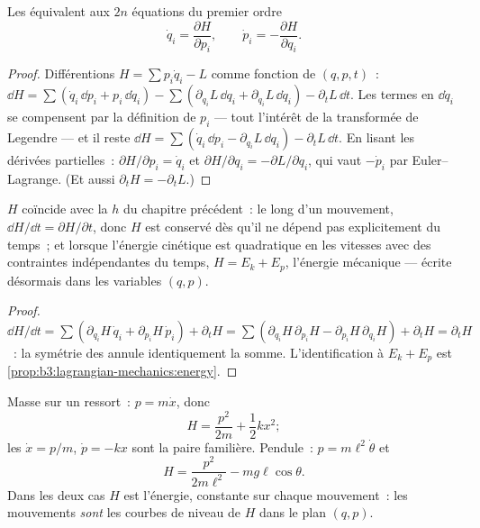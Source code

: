 \begin{theorem}\label{thm:b3:hamiltonian-mechanics:canonical}
Les  équivalent aux $2n$ équations du
premier ordre
\[
\dot q_i = \frac{\partial H}{\partial p_i} , \qquad
\dot p_i = -\frac{\partial H}{\partial q_i} .
\]
\end{theorem}

\begin{proof}
Différentions $H = \sum p_i\dot q_i - L$ comme fonction de $(q, p, t)$~:
$\dd H = \sum(\dot q_i\,\dd p_i + p_i\,\dd\dot q_i) - \sum(
\partial_{q_i}L\,\dd q_i + \partial_{\dot q_i}L\,\dd\dot q_i) -
\partial_tL\,\dd t$. Les termes en $\dd\dot q_i$ se compensent par la
définition de $p_i$ --- tout l'intérêt de la transformée de Legendre ---
et il reste $\dd H = \sum(\dot q_i\,\dd p_i - \partial_{q_i}L\,\dd q_i) -
\partial_tL\,\dd t$. En lisant les dérivées partielles~:
$\partial H/\partial p_i = \dot q_i$ et $\partial H/\partial q_i =
-\partial L/\partial q_i$, qui vaut $-\dot p_i$ par Euler--Lagrange.
(Et aussi $\partial_tH = -\partial_tL$.)
\end{proof}

\begin{proposition}[Ce qu'est $H$]\label{prop:b3:hamiltonian-mechanics:energy}
$H$ coïncide avec la  $h$ du chapitre précédent~:
le long d'un mouvement, $\dd H/\dd t = \partial H/\partial t$, donc $H$
est conservé dès qu'il ne dépend pas explicitement du temps~; et
lorsque l'énergie cinétique est quadratique en les vitesses avec des
contraintes indépendantes du temps, $H = E_k + E_p$, l'énergie
mécanique --- écrite désormais dans les variables $(q, p)$.
\end{proposition}

\begin{proof}
$\dd H/\dd t = \sum(\partial_{q_i}H\,\dot q_i + \partial_{p_i}H\,\dot
p_i) + \partial_tH = \sum(\partial_{q_i}H\,\partial_{p_i}H -
\partial_{p_i}H\,\partial_{q_i}H) + \partial_tH = \partial_tH$~: la
symétrie des  annule identiquement la somme.
L'identification à $E_k + E_p$ est
\cref{prop:b3:lagrangian-mechanics:energy}.
\end{proof}

\begin{example}\label{ex:b3:hamiltonian-mechanics:examples}
Masse sur un ressort~: $p = m\dot x$, donc
\[
H = \frac{p^2}{2m} + \frac12 kx^2 ;
\]
les  $\dot x = p/m$, $\dot p = -kx$ sont la paire
familière. Pendule~: $p = m\ell^2\dot\theta$ et
\[
H = \frac{p^2}{2m\ell^2} - mg\ell\cos\theta .
\]
Dans les deux cas $H$ est l'énergie, constante sur chaque mouvement~:
les mouvements \emph{sont} les courbes de niveau de $H$ dans le plan $(q,p)$.
\end{example}

